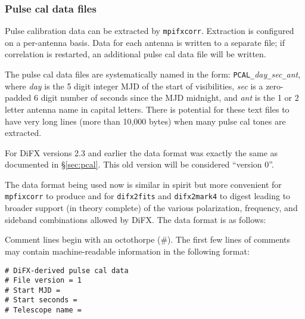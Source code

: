 \subsubsection{Pulse cal data files} \label{sec:difxpulsecal}

Pulse calibration data can be extracted by {\tt mpifxcorr}.
Extraction is configured on a per-antenna basis.
Data for each antenna is written to a separate file; if correlation is restarted, an additional pulse cal data file will be written.

The pulse cal data files are systematically named in the form: {\tt PCAL\_}{\em day}{\tt \_}{\em sec}{\tt \_}{\em ant}, where {\em day} is the 5 digit integer MJD of the start of visibilities, {\em sec} is a zero-padded 6 digit number of seconds since the MJD midnight, and {\em ant} is the 1 or 2 letter antenna name in capital letters.
There is potential for these text files to have very long lines (more than 10,000 bytes) when many pulse cal tones are extracted.

For DiFX versions 2.3 and earlier the data format was exactly the same as documented in \S\ref{sec:pcal}.
This old version will be considered ``version 0''.

The data format being used now is similar in spirit but more convenient for {\tt mpfixcorr} to produce and for {\tt difx2fits} and {\tt difx2mark4} to digest leading to broader support (in theory complete) of the various polarization, frequency, and sideband combinations allowed by DiFX.
The data format is as follows:

Comment lines begin with an octothorpe (\#).
The first few lines of comments may contain machine-readable information in the following format:
\begin{verbatim}
# DiFX-derived pulse cal data
# File version = 1
# Start MJD = 
# Start seconds = 
# Telescope name = 
\end{verbatim}

